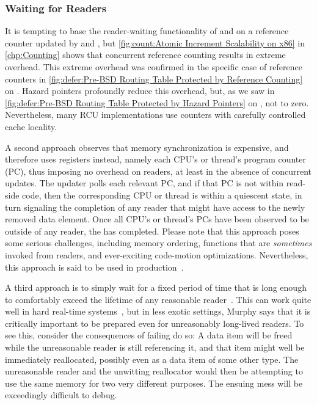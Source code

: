 \subsubsection{Waiting for Readers}
\label{sec:defer:Waiting for Readers}

It is tempting to base the reader-waiting functionality of
 and  on a reference counter
updated by  and , but
\cref{fig:count:Atomic Increment Scalability on x86}
in
\cref{chp:Counting}
shows that concurrent reference counting results in extreme overhead.
This extreme overhead was confirmed in the specific case of
reference counters in
\cref{fig:defer:Pre-BSD Routing Table Protected by Reference Counting}
on
.
Hazard pointers profoundly reduce this overhead, but, as we saw in
\cref{fig:defer:Pre-BSD Routing Table Protected by Hazard Pointers}
on
,
not to zero.
Nevertheless, many RCU implementations use counters with carefully
controlled cache locality.

A second approach observes that memory synchronization is expensive,
and therefore uses registers instead, namely each CPU's or thread's
program counter (PC), thus imposing no overhead on readers, at least
in the absence of concurrent updates.
The updater polls each relevant PC, and if that PC is not within read-side
code, then the corresponding CPU or thread is within a quiescent state,
in turn signaling the completion of any reader that might have access
to the newly removed data element.
Once all CPU's or thread's PCs have been observed to be outside of any
reader, the  has completed.
Please note that this approach poses some serious challenges, including
memory ordering, functions that are \emph{sometimes} invoked from readers,
and ever-exciting code-motion optimizations.
Nevertheless, this approach is said to be used in
production~\cite{MikeAsh2015Apple}.

A third approach is to simply wait for a fixed period of time that is
long enough to comfortably exceed the lifetime of any reasonable
reader~\cite{Jacobson93,AjuJohn95}.
This can work quite well in hard real-time systems~\cite{YuxinRen2018RTRCU},
but in less exotic
settings, Murphy says that it is critically important to be prepared
even for unreasonably long-lived readers.
To see this, consider the consequences of failing do so:
A data item will be freed while the unreasonable reader is still
referencing it, and that item might well be immediately reallocated,
possibly even as a data item of some other type.
The unreasonable reader and the unwitting reallocator would then
be attempting to use the same memory for two very different purposes.
The ensuing mess will be exceedingly difficult to debug.

